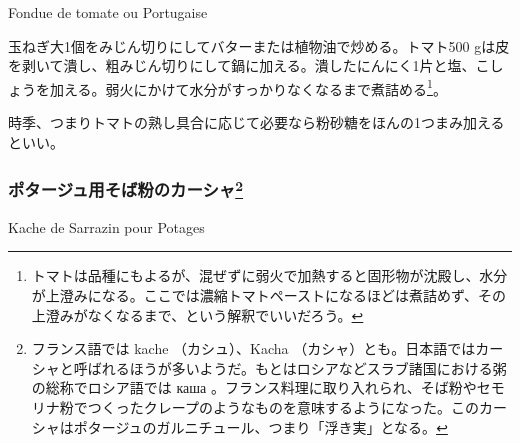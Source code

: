 \begin{recette}
\begin{frsubenv}

Fondue de tomate ou Portugaise

\end{frsubenv}


玉ねぎ大1個をみじん切りにしてバターまたは植物油で炒める。トマト500
gは皮を剥いて潰し、粗みじん切りにして鍋に加える。潰したにんにく1片と塩、こしょうを加える。弱火にかけて水分がすっかりなくなるまで煮詰める\footnote{トマトは品種にもよるが、混ぜずに弱火で加熱すると固形物が沈殿し、水分が上澄みになる。ここでは濃縮トマトペーストになるほどは煮詰めず、その上澄みがなくなるまで、という解釈でいいだろう。}。

時季、つまりトマトの熟し具合に応じて必要なら粉砂糖をほんの1つまみ加えるといい。

\atoaki{}

\hypertarget{kache-de-sarrazin-pour-potage}{%
\subsubsection[ポタージュ用そば粉のカーシャ]{\texorpdfstring{ポタージュ用そば粉のカーシャ\footnote{フランス語では
  kache （カシュ）、Kacha
  （カシャ）とも。日本語ではカーシャと呼ばれるほうが多いようだ。もとはロシアなどスラブ諸国における粥の総称でロシア語では
  каша
  。フランス料理に取り入れられ、そば粉やセモリナ粉でつくったクレープのようなものを意味するようになった。このカーシャはポタージュのガルニチュール、つまり「浮き実」となる。}}{ポタージュ用そば粉のカーシャ}}\label{kache-de-sarrazin-pour-potage}}

\begin{frsubenv}

Kache de Sarrazin pour Potages

\end{frsubenv}



\end{recette}
